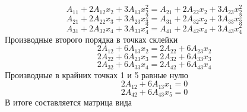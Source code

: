 \documentclass[russian,utf8,nocolumnxxxi,nocolumnxxxii]{eskdtext}
\begin{document}
\begin{equation}
A_{11} + 2A_{12}x_2 + 3A_{13}x^2_2=A_{21} + 2A_{22}x_2 + 3A_{23}x^2_2
\end{equation}
\begin{equation}
A_{21} + 2A_{22}x_3 + 3A_{23}x^2_3= A_{31} + 2A_{32}x_2 + 3A_{33}x^2_3
\end{equation}
\begin{equation}
A_{31} + 2A_{32}x_4 + 3A_{33}x^2_4= A_{41} + 2A_{42}x_4 + 3A_{43}x^2_4
\end{equation}
Производные второго порядка в точках склейки
\begin{equation}
2A_{12} + 6A_{13}x_2=2A_{22} + 6A_{23}x_2
\end{equation}
\begin{equation}
2A_{22} + 6A_{23}x_3= 2A_{32} + 6A_{33}x_3
\end{equation}
\begin{equation}
2A_{32} + 6A_{33}x_4= 2A_{42} + 6A_{43}x_4
\end{equation}
Производные в крайних точках 1 и 5 равные нулю 
\begin{equation}
2A_{12} + 6A_{13}x_1=0
\end{equation}
\begin{equation}
2A_{42} + 6A_{43}x_5= 0
\end{equation}
В итоге составляется матрица вида
\end{document}
